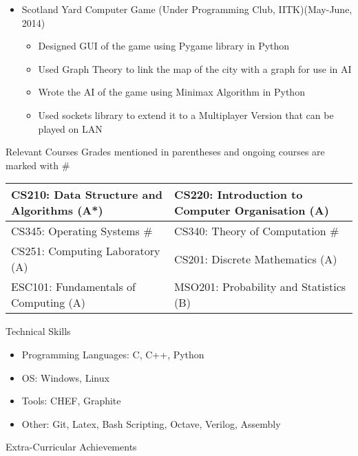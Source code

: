 \documentclass{article}
\begin{document}
\begin{itemize}
\item {\large Scotland Yard Computer Game}\newline
(Under Programming Club, IITK)\hfill (May-June, 2014)
	\begin{itemize}
	\item Designed GUI of the game using Pygame library in Python
	\item Used Graph Theory to link the map of the city with a graph for use in AI
	\item Wrote the AI of the game using Minimax Algorithm in Python

	\item Used sockets library to extend it to a Multiplayer Version that can be played on LAN
	\end{itemize}
	\end{itemize}
\vspace{10pt}	
{\Large Relevant Courses}
\newline
Grades mentioned in parentheses and ongoing courses are marked with \#
\newline
\newline
\begin{tabular}{|m{8.5cm} | m{8.5cm}|}
\hline
CS210: Data Structure and Algorithms (A*) & CS220: Introduction to Computer Organisation (A)\\ 
\hline
CS345: Operating Systems \# & CS340: Theory of Computation \#\\
\hline
CS251: Computing Laboratory (A) & CS201: Discrete Mathematics (A)\\
\hline
ESC101: Fundamentals of Computing (A) & MSO201: Probability and Statistics (B)\\
\hline
\end{tabular}
\newline
\newline
\newline
{\Large Technical Skills}
\begin{itemize}
\item Programming Languages: C, C++, Python
\item OS: Windows, Linux
\item Tools: CHEF, Graphite
\item Other: Git, Latex, Bash Scripting, Octave, Verilog, Assembly
\end{itemize} 
\vspace{10pt}
{\Large Extra-Curricular Achievements}
\end{document}
